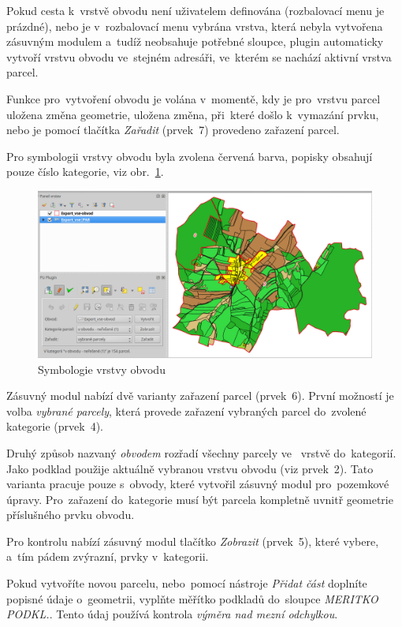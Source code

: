 Pokud cesta k~vrstvě obvodu není uživatelem definována (rozbalovací menu je prázdné), nebo je v~rozbalovací menu vybrána vrstva, která nebyla vytvořena zásuvným modulem a~tudíž neobsahuje potřebné sloupce, plugin automaticky vytvoří vrstvu obvodu ve~stejném adresáři, ve~kterém se nachází aktivní vrstva parcel.

Funkce pro~vytvoření obvodu je volána v~momentě, kdy je pro~vrstvu parcel uložena změna geometrie, uložena změna, při~které došlo k~vymazání prvku, nebo je pomocí tlačítka \textit{Zařadit} (prvek~7) provedeno zařazení parcel.

Pro symbologii vrstvy obvodu byla zvolena červená barva, popisky obsahují pouze číslo kategorie, viz obr.~\ref{fig:manual_symbologie_obvod}.

	\begin{figure}[H]
		\centering
		\includegraphics[width=1.0\textwidth]{./pictures/symbologie_obvod.png}
		\caption[Symbologie vrstvy obvodu]{Symbologie vrstvy obvodu}
		\label{fig:manual_symbologie_obvod}
 	\end{figure}

Zásuvný modul nabízí dvě varianty zařazení parcel (prvek~6). První možností je volba \textit{vybrané parcely}, která provede zařazení vybraných parcel do~zvolené kategorie (prvek~4).

Druhý způsob nazvaný \textit{obvodem} rozřadí všechny parcely ve~ vrstvě do~ka\-tegorií. Jako podklad použije aktuálně vybranou vrstvu obvodu (viz prvek~2). Tato varianta pracuje pouze s~obvody, které vytvořil zásuvný modul pro~pozemkové úpravy. Pro~zařazení do~kategorie musí být parcela kompletně uvnitř geometrie příslušného prvku obvodu.

Pro kontrolu nabízí zásuvný modul tlačítko \textit{Zobrazit} (prvek~5), které vybere, a~tím pádem zvýrazní, prvky v~kategorii.

Pokud vytvoříte novou parcelu, nebo~pomocí nástroje \textit{Přidat část} doplníte popis\-né údaje o~geometrii, vyplňte měřítko podkladů do~sloupce \textit{MERITKO PODKL.}. Tento údaj používá kontrola \textit{výměra nad mezní odchylkou}.

